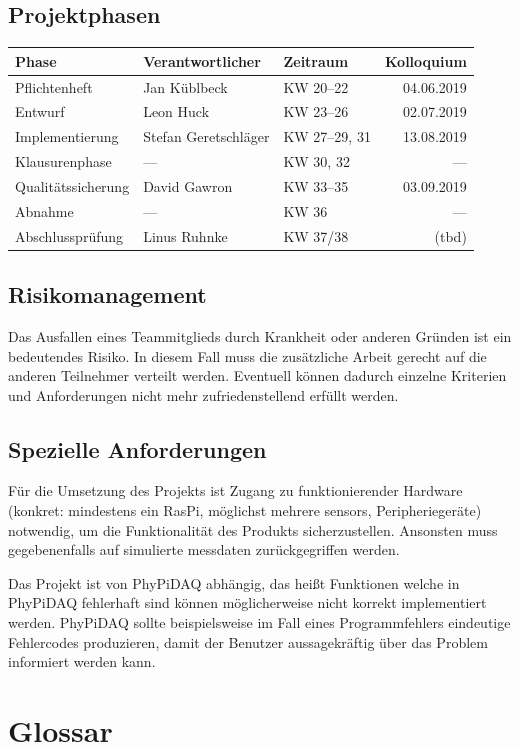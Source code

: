 \documentclass[parskip=full]{scrartcl}
\begin{document}
\subsection{Projektphasen}

\begin{tabular}{| l | l | l | r |}
	\hline
	\textbf{Phase} & \textbf{Verantwortlicher} & \textbf{Zeitraum} & \textbf{Kolloquium} \\ \hline
	Pflichtenheft & Jan Küblbeck & KW 20–22 & 04.06.2019 \\
	Entwurf & Leon Huck & KW 23–26 & 02.07.2019 \\
	Implementierung & Stefan Geretschläger & KW 27–29, 31 & 13.08.2019 \\
	Klausurenphase & — & KW 30, 32 & — \\
	Qualitätssicherung & David Gawron & KW 33–35 & 03.09.2019 \\
	Abnahme & — & KW 36 & — \\
	Abschlussprüfung & Linus Ruhnke & KW 37/38 & (tbd) \\
	\hline
\end{tabular}

\subsection{Risikomanagement}

Das Ausfallen eines Teammitglieds durch Krankheit oder anderen Gründen ist ein bedeutendes Risiko. In diesem Fall muss die zusätzliche Arbeit gerecht auf die anderen Teilnehmer verteilt werden. Eventuell können dadurch einzelne Kriterien und Anforderungen nicht mehr zufriedenstellend erfüllt werden.

\subsection{Spezielle Anforderungen}\label{entwicklungsumgebung}

Für die Umsetzung des Projekts ist Zugang zu funktionierender Hardware (konkret: mindestens ein \gls{RasPi}, möglichst mehrere \glspl{sensor}, Peripheriegeräte) notwendig, um die Funktionalität des Produkts sicherzustellen.\newline
Ansonsten muss gegebenenfalls auf simulierte \gls{messdaten} zurückgegriffen werden.

Das Projekt ist von \gls{PhyPiDAQ} abhängig, das heißt Funktionen welche in PhyPiDAQ fehlerhaft sind können möglicherweise nicht korrekt implementiert werden. PhyPiDAQ sollte beispielsweise im Fall eines Programmfehlers eindeutige Fehlercodes produzieren, damit der Benutzer aussagekräftig über das Problem informiert werden kann.

\clearpage
\section{Glossar}\label{glossar}

\renewcommand*{\glossarysection}[2][]{}	%
\printnoidxglossaries				%
\end{document}

